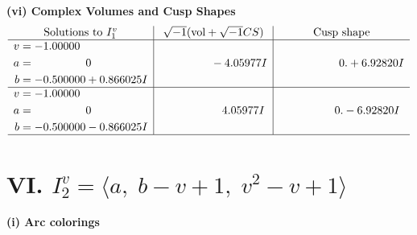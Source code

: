 \documentclass[1p]{elsarticle_modified}
\theoremstyle{definition}
\newcommand{\I}{\sqrt{-1}}
\begin{document}
\newpage\flushleft \textbf{(vi) Complex Volumes and Cusp Shapes}
$$\begin{array}{c|c|c}  
\text{Solutions to }I^v_{1}& \I (\text{vol} + \sqrt{-1}CS) & \text{Cusp shape}\\
 \hline 
\begin{aligned}
v &= -1.00000\phantom{ +0.000000I} \\
a &= \phantom{-0.000000 } 0 \\
b &= -0.500000 + 0.866025 I\end{aligned}
 & \phantom{-0.000000 } -4.05977 I & \phantom{-0.000000 -}0. + 6.92820 I \\ \hline\begin{aligned}
v &= -1.00000\phantom{ +0.000000I} \\
a &= \phantom{-0.000000 } 0 \\
b &= -0.500000 - 0.866025 I\end{aligned}
 & \phantom{-0.000000 -}4.05977 I & \phantom{-0.000000 } 0. - 6.92820 I\\
 \hline 
 \end{array}$$\newpage\newpage\renewcommand{\arraystretch}{1}
\centering \section*{VI. $I^v_{2}= \langle a,\;b- v+1,\;v^2- v+1 \rangle$}
\flushleft \textbf{(i) Arc colorings}\\
\end{document}

